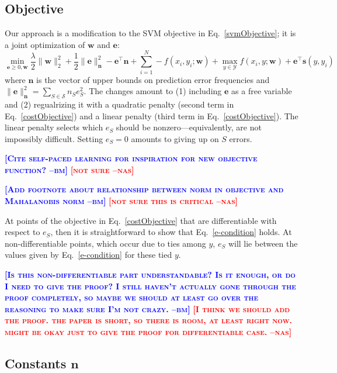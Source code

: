 \documentclass{article} %
\newcommand{\bmcomment}[1]{\textcolor{blue}{\textsc{\textbf{[#1 --bm]}}}}
\newcommand{\nascomment}[1]{\textcolor{red}{\textsc{\textbf{[#1 --nas]}}}}
\begin{document}
\subsection{Objective}

Our approach is a modification to the SVM objective in
Eq.~\ref{svmObjective}; it is a joint optimization of $\mathbf{w}$ and $\mathbf{e}$:
\begin{equation}
\label{costObjective}
\min_{\mathbf{e}\geq 0,\mathbf{w}} \frac{\lambda}{2}\|\mathbf{w}\|_2^2
+ \frac{1}{2} \|\mathbf{e}\|_{\mathbf{n}}^2 - \mathbf{e}^\top
\mathbf{n} + \sum_{i=1}^N -f(x_i,y_i; \mathbf{w})  + \max_{y \in
  \mathcal{Y}} f(x_i,y ; \mathbf{w}) + \mathbf{e}^\top \mathbf{s}(y, y_i)
\end{equation}
where $\mathbf{n}$ is the vector of upper bounds on prediction error
frequencies and $\|\mathbf{e}\|_{\mathbf{n}}^2 = \sum_{S \in
  \mathcal{S}} n_Se_S^2$.  The changes amount to (1) including
$\mathbf{e}$ as a free variable and (2) regualrizing it with a quadratic
penalty (second term in Eq.~\ref{costObjective}) and a linear penalty
(third term in Eq.~\ref{costObjective}).  The linear penalty selects
which $e_S$ should be nonzero---equivalently, are not impossibly
difficult.  Setting $e_S = 0$ amounts to giving up on $S$ errors.


\bmcomment{Cite self-paced learning for inspiration for new objective
  function?} \nascomment{not sure}

\bmcomment{Add footnote about relationship between norm in objective and
Mahalanobis norm} \nascomment{not sure this is critical}

At points of the objective in Eq.~\ref{costObjective} that are differentiable with respect to $e_S$, then it is
straightforward to show that Eq.~\ref{e-condition} holds.  At
non-differentiable points, which occur due to ties among $y$, $e_S$ will lie
between the values given by Eq.~\ref{e-condition} for these tied $y$.

\bmcomment{Is this non-differentiable part understandable?  Is it enough,
or do I need to give the proof?  I still haven't actually gone through
the proof completely, so maybe we should at least go over the reasoning
to make sure I'm not crazy.} \nascomment{I think we should add the
proof.  the paper is short, so there is room, at least right now.
might be okay just to give the proof for differentiable case.}


\subsection{Constants $\mathbf{n}$}
\end{document}

